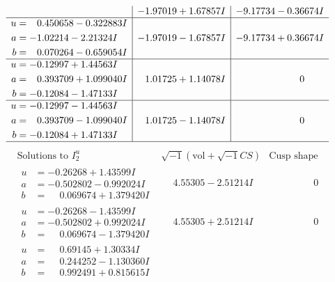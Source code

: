 \documentclass[1p]{elsarticle_modified}
\theoremstyle{definition}
\newcommand{\I}{\sqrt{-1}}
\begin{document}
$$\begin{array}{c|c|c}
 & -1.97019 + 1.67857 I & -9.17734 - 0.36674 I \\ \hline\begin{aligned}
u &= \phantom{-}0.450658 - 0.322883 I \\
a &= -1.02214 - 2.21324 I \\
b &= \phantom{-}0.070264 - 0.659054 I\end{aligned}
 & -1.97019 - 1.67857 I & -9.17734 + 0.36674 I \\ \hline\begin{aligned}
u &= -0.12997 + 1.44563 I \\
a &= \phantom{-}0.393709 + 1.099040 I \\
b &= -0.12084 - 1.47133 I\end{aligned}
 & \phantom{-}1.01725 + 1.14078 I & \phantom{-0.000000 } 0 \\ \hline\begin{aligned}
u &= -0.12997 - 1.44563 I \\
a &= \phantom{-}0.393709 - 1.099040 I \\
b &= -0.12084 + 1.47133 I\end{aligned}
 & \phantom{-}1.01725 - 1.14078 I & \phantom{-0.000000 } 0\\
 \hline 
 \end{array}$$\newpage$$\begin{array}{c|c|c}  
\text{Solutions to }I^u_{2}& \I (\text{vol} + \sqrt{-1}CS) & \text{Cusp shape}\\
 \hline 
\begin{aligned}
u &= -0.26268 + 1.43599 I \\
a &= -0.502802 - 0.992024 I \\
b &= \phantom{-}0.069674 + 1.379420 I\end{aligned}
 & \phantom{-}4.55305 - 2.51214 I & \phantom{-0.000000 } 0 \\ \hline\begin{aligned}
u &= -0.26268 - 1.43599 I \\
a &= -0.502802 + 0.992024 I \\
b &= \phantom{-}0.069674 - 1.379420 I\end{aligned}
 & \phantom{-}4.55305 + 2.51214 I & \phantom{-0.000000 } 0 \\ \hline\begin{aligned}
u &= \phantom{-}0.69145 + 1.30334 I \\
a &= \phantom{-}0.244252 - 1.130360 I \\
b &= \phantom{-}0.992491 + 0.815615 I\end{aligned}

\end{array}$$
\end{document}
